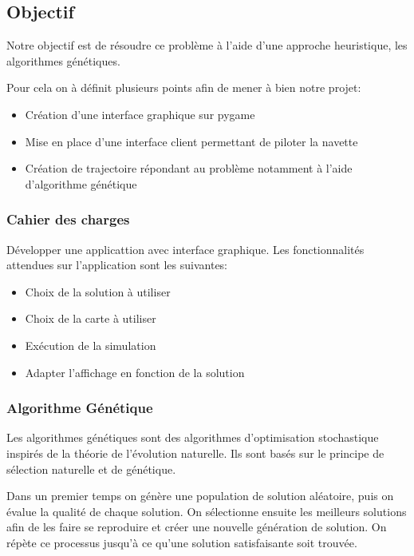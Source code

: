 \documentclass[french,a4paper,10pt,twocolumn]{article}
\begin{document}
\subsection{Objectif}


Notre objectif est de résoudre ce problème à l'aide d'une approche heuristique, les algorithmes génétiques. 

Pour cela on à définit plusieurs points afin de mener à bien notre projet: 
\begin{itemize}
    \item Création d'une interface graphique sur pygame
    \item Mise en place d'une interface client permettant de piloter la navette
    \item Création de trajectoire répondant au problème notamment à l'aide d'algorithme génétique    
\end{itemize}

\subsubsection{Cahier des charges}

Développer une applicattion avec interface graphique. Les fonctionnalités attendues sur l'application sont les suivantes:
\begin{itemize}
    \item Choix de la solution à utiliser
    \item Choix de la carte à utiliser
    \item Exécution de la simulation
    \item Adapter l'affichage en fonction de la solution
\end{itemize}



\subsubsection{Algorithme Génétique}

Les algorithmes génétiques sont des algorithmes d'optimisation stochastique inspirés de la théorie de l'évolution naturelle.
Ils sont basés sur le principe de sélection naturelle et de génétique.

Dans un premier temps on génère une population de solution aléatoire, puis on évalue la qualité de chaque solution.
On sélectionne ensuite les meilleurs solutions afin de les faire se reproduire et créer une nouvelle génération de solution.
On répète ce processus jusqu'à ce qu'une solution satisfaisante soit trouvée.
\end{document}
